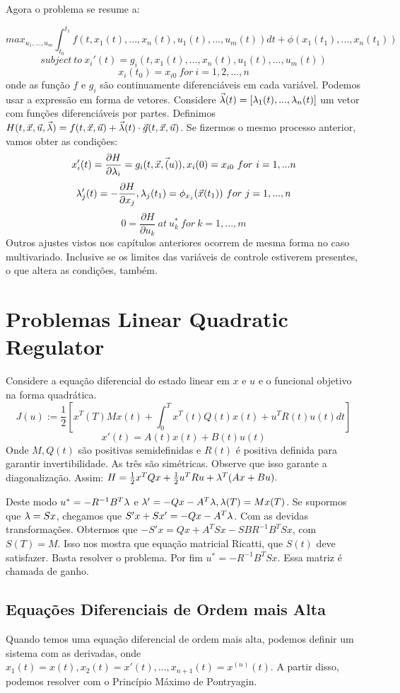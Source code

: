 Agora o problema se resume a:

$$
max_{u_1,...,u_m} \int_{t_0}^{t_1} f(t,x_1(t),...,x_n(t),u_1(t),...,u_m(t)) dt + \phi(x_1(t_1),...,x_n(t_1))
$$
$$
subject~to~x_i'(t) = g_i(t,x_1(t),...,x_n(t),u_1(t),...,u_m(t))
$$
$$
x_i(t_0) = x_{i0}~for~i=1,2,...,n
$$
onde as função $f$ e $g_i$ são continuamente diferenciáveis em cada variável. Podemos usar a expressão em forma de vetores. Considere $\Vec{\lambda}(t) = [\lambda_1(t),...,\lambda_n(t)]$ um vetor com funções diferenciáveis por partes. Definimos $H(t,\Vec{x},\Vec{u},\Vec{\lambda}) = f(t,\Vec{x},\Vec{u}) + \Vec{\lambda}(t)\cdot \Vec{g}(t,\Vec{x},\Vec{u})$. Se fizermos o mesmo processo anterior, vamos obter as condições:
$$
x'_i(t) = \frac{\partial H}{\partial \lambda_i} = g_i(t,\Vec{x},\Vec(u)), x_i(0) = x_{i0}~for~i = 1,...n 
$$
$$
\lambda'_j(t) = - \frac{\partial H}{\partial x_j}, \lambda_j(t_1) = \phi_{x_j}(\Vec{x}(t_1))~for~j=1,...,n
$$
$$
0 = \frac{\partial H}{\partial u_k}~at~u^*_k~for~k=1,...,m
$$
Outros ajustes vistos nos capítulos anteriores ocorrem de mesma forma no caso multivariado. Inclusive se os limites das variáveis de controle estiverem presentes, o que altera as condições, também. 

\section{Problemas Linear Quadratic Regulator}

Considere a equação diferencial do estado linear em $x$ e $u$ e o funcional objetivo na forma quadrática. 
$$
J(u) := \frac{1}{2}[x^T(T)Mx(t) + \int_0^T x^T(t)Q(t)x(t) + u^TR(t)u(t) dt]
$$
$$
x'(t) = A(t)x(t) + B(t)u(t)
$$
Onde $M, Q(t)$ são positivas semidefinidas e $R(t)$ é positiva definida para garantir invertibilidade. As três são simétricas. Observe que isso garante a diagonalização.
Assim: $H = \frac{1}{2}x^TQx + \frac{1}{2}u^TRu + \lambda^T(Ax + Bu).$ 

Deste modo $u^* = - R^{-1}B^T\lambda$ e $\lambda' = -Qx - A^T\lambda, \lambda(T) = Mx(T)$. Se supormos que $\lambda = Sx$, chegamos que $S'x + Sx' = -Qx - A^T\lambda$. Com as devidas transformações. Obtermos que $-S'x = Qx + A^TSx - SBR^{-1}B^TSx$, com $S(T) = M$. Isso nos mostra que equação matricial Ricatti, que $S(t)$ deve satisfazer. Basta resolver o problema. Por fim $u^* = -R^{-1}B^TSx$. Essa matriz é chamada de ganho. 

\subsection{Equações Diferenciais de Ordem mais Alta}
Quando temos uma equação diferencial de ordem mais alta, podemos definir um sistema com as derivadas, onde $x_1(t) = x(t), x_2(t) = x'(t), ..., x_{n+1}(t) = x^{(n)}(t)$. A partir disso, podemos resolver com o Princípio Máximo de Pontryagin. 

